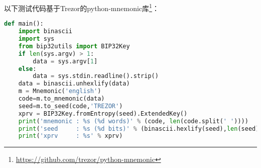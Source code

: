 以下测试代码基于Trezor的python-mnemonic库\footnote{\url{https://github.com/trezor/python-mnemonic}}：

\begin{lstlisting}[language=python]
def main():
    import binascii
    import sys
    from bip32utils import BIP32Key
    if len(sys.argv) > 1:
        data = sys.argv[1]
    else:
        data = sys.stdin.readline().strip()
    data = binascii.unhexlify(data)
    m = Mnemonic('english')
    code=m.to_mnemonic(data)
    seed=m.to_seed(code,'TREZOR')
    xprv = BIP32Key.fromEntropy(seed).ExtendedKey()
    print('mnemonic : %s (%d words)' % (code, len(code.split(' '))))
    print('seed     : %s (%d bits)' % (binascii.hexlify(seed),len(seed) * 4))
    print('xprv     : %s' % xprv)
\end{lstlisting}

